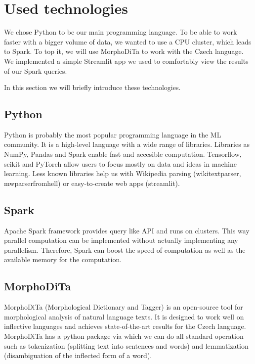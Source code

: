 

\section{Used technologies}
We chose Python to be our main programming language. To be able to work faster with a bigger volume of data, we wanted to use a CPU cluster, which leads to Spark. To top it, we will use MorphoDiTa to work with the Czech language. We implemented a simple Streamlit app we used to comfortably view the results of our Spark queries.

In this section we will briefly introduce these technologies.

\subsection{Python}
Python is probably the most popular programming language in the ML community. It is a high-level language with a wide range of libraries. Libraries as NumPy, Pandas and Spark enable fast and accesible computation. Tensorflow, scikit and PyTorch allow users to focus mostly on data and ideas in machine learning. Less known libraries help us with Wikipedia parsing (wikitextparser, mwparserfromhell) or easy-to-create web apps (streamlit).

\subsection{Spark}
Apache Spark framework provides query like API and runs on clusters. This way parallel computation can be implemented without actually implementing any parallelism. Therefore, Spark can boost the speed of computation as well as the available memory for the computation.


\subsection{MorphoDiTa}

MorphoDiTa \cite{Morphodita} (Morphological Dictionary and Tagger) is an open-source tool for morphological analysis of natural language texts. It is designed to work well on inflective languages and achieves state-of-the-art results for the Czech language. MorphoDiTa has a python package via which we can do all standard operation such as tokenization (splitting text into sentences and words) and lemmatization (disambiguation of the inflected form of a word).


